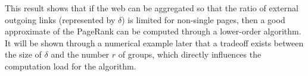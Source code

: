 \documentclass[11pt,draftcls,onecolumn]{IEEEtran}
\begin{document}
This result \cite{IshTemBai:12} shows that if the web can be aggregated so that 
the ratio of external outgoing links (represented by $\delta$) 
is limited for non-single pages,
then a good approximate of the PageRank can be computed
through a lower-order algorithm. It will be shown through
a numerical example later that a tradeoff exists between
the size of $\delta$ and the number $r$ of groups, which
directly influences the computation load for the algorithm. 







\end{document}
